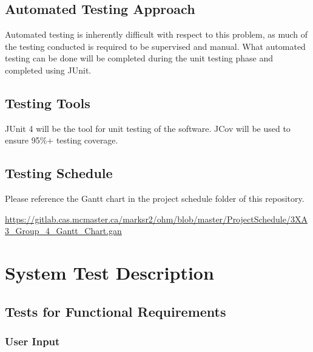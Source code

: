 \documentclass[12pt, titlepage]{article}
\begin{document}
\subsection{Automated Testing Approach}
Automated testing is inherently difficult with respect to this problem, as much of the testing conducted is required to be supervised and manual. What automated testing can be done will be completed during the unit testing phase and completed using JUnit.
\subsection{Testing Tools}
\par JUnit 4 will be the tool for unit testing of the software. JCov will be used to ensure 95\%+ testing coverage.
\subsection{Testing Schedule}
Please reference the Gantt chart in the project schedule folder of this repository.

\url{https://gitlab.cas.mcmaster.ca/marksr2/ohm/blob/master/ProjectSchedule/3XA3_Group_4_Gantt_Chart.gan}

\section{System Test Description}
	
\subsection{Tests for Functional Requirements}
\subsubsection{User Input}
\end{document}
